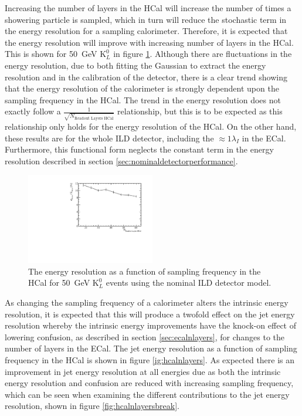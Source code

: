 Increasing the number of layers in the HCal will increase the number of times a showering particle is sampled, which in turn will reduce the stochastic term in the energy resolution for a sampling calorimeter.  Therefore, it is expected that the energy resolution will improve with increasing number of layers in the HCal.  This is shown for 50~GeV $\text{K}^{0}_{L}$ in figure \ref{fig:hcalnlayerser}.  Although there are fluctuations in the energy resolution, due to both fitting the Gaussian to extract the energy resolution and in the calibration of the detector, there is a clear trend showing that the energy resolution of the calorimeter is strongly dependent upon the sampling frequency in the HCal.   The trend in the energy resolution does not exactly follow a $\frac{1}{\sqrt{N_{\text{Readout Layers HCal}}}}$ relationship, but this is to be expected as this relationship only holds for the energy resolution of the HCal.  On the other hand, these results are for the whole ILD detector, including the $\approx 1 \lambda_{I}$ in the ECal.  Furthermore, this functional form neglects the constant term in the energy resolution described in section \ref{sec:nominaldetectorperformance}.  

\begin{figure}[h!]
\centering
\includegraphics[width=0.5\textwidth]{OptimisationStudies/Plots/EnergyResolution/ER_vs_NHCalVariableLayers_50GeVKaon0L.pdf}
\caption[The energy resolution as a function of sampling frequency in the HCal for 50~GeV $\text{K}^{0}_{L}$ events using the nominal ILD detector model.]{The energy resolution as a function of sampling frequency in the HCal for 50~GeV $\text{K}^{0}_{L}$ events using the nominal ILD detector model.}
\label{fig:hcalnlayerser}
\end{figure}

As changing the sampling frequency of a calorimeter alters the intrinsic energy resolution, it is expected that this will produce a twofold effect on the jet energy resolution whereby the intrinsic energy improvements have the knock-on effect of lowering confusion, as described in section \ref{sec:ecalnlayers}, for changes to the number of layers in the ECal.  The jet energy resolution as a function of sampling frequency in the HCal is shown in figure \ref{ig:hcalnlayers}.  As expected there is an improvement in jet energy resolution at all energies due as both the intrinsic energy resolution and confusion are reduced with increasing sampling frequency, which can be seen when examining the different contributions to the jet energy resolution, shown in figure \ref{fig:hcalnlayersbreak}.  

